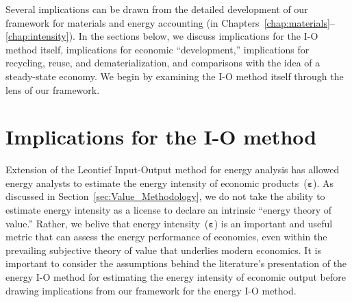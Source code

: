 

Several implications can be drawn from the detailed development 
of our framework for materials and energy accounting 
(in Chapters~\ref{chap:materials}--\ref{chap:intensity}).
In the sections below, we discuss 
implications for the I-O method itself,
implications for economic ``development,''
implications for recycling, reuse, and dematerialization, and
comparisons with the idea of a steady-state economy.
We begin by examining the I-O method itself 
through the lens of our framework.


\section{Implications for the I-O method}
\label{sec:Implications_for_IO}

Extension of the Leontief 
Input-Output method
for energy analysis has allowed energy analysts to estimate 
the energy intensity
of economic products~($\boldsymbol{\varepsilon}$). 
As discussed in Section~\ref{sec:Value_Methodology},
we do not take the ability to estimate energy intensity as a license
to declare an intrinsic ``energy theory of value.''
Rather, we belive that energy intensity~($\boldsymbol{\varepsilon}$) is an 
important and useful metric that can assess 
the energy performance of economies,
even within the prevailing subjective theory of value
that underlies modern economics.
It is important to consider the assumptions behind
the literature's presentation of the energy I-O method 
for estimating the energy intensity of economic output
before drawing implications from our framework 
for the energy I-O method.

